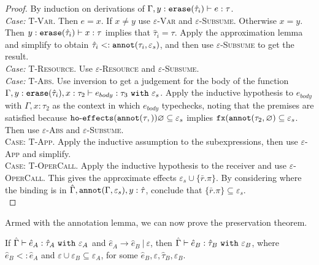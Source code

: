 \begin{proof}
By induction on derivations of $\Gamma, y: \mathtt{erase}(\hat \tau_i) \vdash e: \tau$.\\

\textit{Case:} \textsc{T-Var}. Then $e = x$. If $x \neq y$ use \textsc{$\varepsilon$-Var} and \textsc{$\varepsilon$-Subsume}. Otherwise $x = y$. Then $y: \mathtt{erase}(\hat \tau_i) \vdash x: \tau$ implies that $\hat \tau_i = \tau$. Apply the approximation lemma and simplify to obtain $\hat \tau_i <: \mathtt{annot}(\tau_i, \varepsilon_s)$, and then use \textsc{$\varepsilon$-Subsume} to get the result.\\

\textit{Case:} \textsc{T-Resource}. Use \textsc{$\varepsilon$-Resource} and \textsc{$\varepsilon$-Subsume}.\\

\textit{Case:} \textsc{T-Abs}. Use inversion to get a judgement for the body of the function $\Gamma, y: \mathtt{erase}(\hat \tau_i), x: \tau_2 \vdash e_{body}: \tau_3~\mathtt{with}~ \varepsilon_s$. Apply the inductive hypothesis to $e_{body}$ with $\Gamma, x: \tau_2$ as the context in which $e_{body}$ typechecks, noting that the premises are satisfied because $\mathtt{ho \hbox{-} effects}(\mathtt{annot}(\tau, )){\varnothing} \subseteq \varepsilon_s$ implies $\mathtt{fx}(\mathtt{annot}(\tau_2, \varnothing) \subseteq \varepsilon_s$. Then use \textsc{$\varepsilon$-Abs} and \textsc{$\varepsilon$-Subsume}.	\\

\textsc{Case:} \textsc{T-App}. Apply the inductive assumption to the subexpressions, then use \textsc{$\varepsilon$-App} and simplify.\\

\textsc{Case:} \textsc{T-OperCall}. Apply the inductive hypothesis to the receiver and use \textsc{$\varepsilon$-OperCall}. This gives the approximate effects $\varepsilon_s \cup \{ \bar r.\pi \}$. By considering where the binding is in $\hat \Gamma, \mathtt{annot}(\Gamma, \varepsilon_s), y: \hat \tau$, conclude that $\{ \bar r.\pi \} \subseteq \varepsilon_s$.\\

\end{proof}

\noindent


Armed with the annotation lemma, we can now prove the preservation theorem.


\begin{theorem}
If $\hat \Gamma \vdash \hat e_A: \hat \tau_A~\mathtt{with}~ \varepsilon_A$ and $\hat e_A \longrightarrow \hat e_B~|~\varepsilon$, then $\hat \Gamma \vdash \hat e_B: \hat \tau_B~\mathtt{with}~ \varepsilon_B$, where $\hat e_B <: \hat e_A$ and $\varepsilon \cup \varepsilon_B \subseteq \varepsilon_A$, for some $\hat e_B, \varepsilon, \hat \tau_B, \varepsilon_B$.
\end{theorem}

